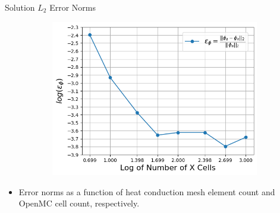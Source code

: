 \documentclass[9pt,t]{beamer}
\begin{document}
\begin{frame}{Solution $L_{2}$ Error Norms}
\begin{figure}[T]
\begin{subfigure}{0.4995\linewidth}
            \includegraphics[height=0.85\linewidth]{figures/flux_error_norms.png}
        \end{subfigure}
    \end{figure}
    \begin{itemize}
        \item Error norms as a function of heat conduction mesh element count and OpenMC cell count, respectively.
    \end{itemize}
\end{frame}
\end{document}
